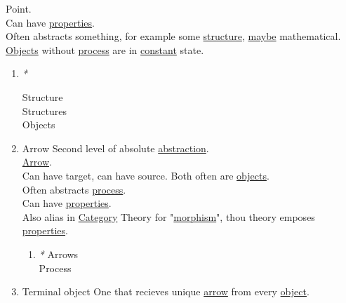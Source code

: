 \documentclass[a4paper,14pt,oneside]{book}
\begin{document}
Point.\\

Can have \hyperref[org25713c8]{properties}.\\

Often abstracts something, for example some \hyperref[org638bf3c]{structure}, \hyperref[org04b0db9]{maybe} mathematical.\\

\hyperref[org75bbfb1]{Objects} without \hyperref[orgc8d4f36]{process} are in \hyperref[org67a12c4]{constant} state.\\

\begin{enumerate}
\item \emph{*}
\label{sec:orgce0301d}

\label{org638bf3c}Structure\\
\label{org95af9d2}Structures\\
\label{org75bbfb1}Objects\\

\item \label{org7b5665a}Arrow
\label{sec:orgc9d801e}
Second level of absolute \hyperref[orgf49d7a2]{abstraction}.\\

\hyperref[orga07bb6a]{Arrow}.\\

Can have target, can have source. Both often are \hyperref[org75bbfb1]{objects}.\\

Often abstracts \hyperref[orgc8d4f36]{process}.\\

Can have \hyperref[org25713c8]{properties}.\\

Also alias in \hyperref[org69f32f1]{Category} Theory for "\hyperref[orgf20950a]{morphism}", thou theory emposes \hyperref[org25713c8]{properties}.\\

\begin{enumerate}
\item \emph{*}
\label{sec:org1481847}
\label{org9c7e7b7}Arrows\\
\label{orgc8d4f36}Process\\
\end{enumerate}

\item \label{org7ae5932}Terminal object
\label{sec:org19eb46c}
One that recieves unique \hyperref[orga07bb6a]{arrow} from every \hyperref[orgf695f6d]{object}.\\


\end{enumerate}
\end{document}
